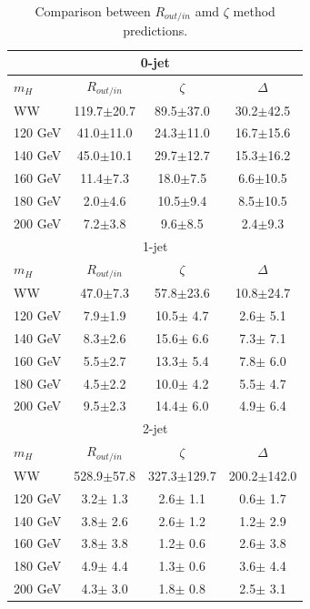 \begin{table}
{%
 \begin{center}
 \begin{tabular}{l | c c | c }
\hline
\multicolumn{4}{c}{0-jet} \\
 \hline
 $m_H$ & $R_{out/in}$ & $\zeta$ & $\Delta$ \\
 \hline
         WW & 119.7$\pm$20.7 & 89.5$\pm$37.0 & 30.2$\pm$42.5 \\
    120 GeV &  41.0$\pm$11.0 & 24.3$\pm$11.0 & 16.7$\pm$15.6 \\
    140 GeV &  45.0$\pm$10.1 & 29.7$\pm$12.7 & 15.3$\pm$16.2 \\
    160 GeV &  11.4$\pm$7.3  & 18.0$\pm$7.5  &  6.6$\pm$10.5 \\
    180 GeV &   2.0$\pm$4.6  & 10.5$\pm$9.4  &  8.5$\pm$10.5 \\
    200 GeV &   7.2$\pm$3.8  &  9.6$\pm$8.5  &  2.4$\pm$9.3  \\
 \hline
 \hline
\multicolumn{4}{c}{1-jet} \\
 \hline
 $m_H$ & $R_{out/in}$ & $\zeta$ & $\Delta$ \\
 \hline
         WW & 47.0$\pm$7.3 & 57.8$\pm$23.6 & 10.8$\pm$24.7 \\
    120 GeV &  7.9$\pm$1.9 & 10.5$\pm$ 4.7 &  2.6$\pm$ 5.1 \\
    140 GeV &  8.3$\pm$2.6 & 15.6$\pm$ 6.6 &  7.3$\pm$ 7.1 \\
    160 GeV &  5.5$\pm$2.7 & 13.3$\pm$ 5.4 &  7.8$\pm$ 6.0 \\
    180 GeV &  4.5$\pm$2.2 & 10.0$\pm$ 4.2 &  5.5$\pm$ 4.7 \\
    200 GeV &  9.5$\pm$2.3 & 14.4$\pm$ 6.0 &  4.9$\pm$ 6.4 \\
 \hline
 \hline
\multicolumn{4}{c}{2-jet} \\
 \hline
 $m_H$ & $R_{out/in}$ & $\zeta$ & $\Delta$ \\
 \hline
         WW & 528.9$\pm$57.8 & 327.3$\pm$129.7 & 200.2$\pm$142.0 \\
    120 GeV &   3.2$\pm$ 1.3 &   2.6$\pm$  1.1 &   0.6$\pm$  1.7 \\
    140 GeV &   3.8$\pm$ 2.6 &   2.6$\pm$  1.2 &   1.2$\pm$  2.9 \\
    160 GeV &   3.8$\pm$ 3.8 &   1.2$\pm$  0.6 &   2.6$\pm$  3.8 \\
    180 GeV &   4.9$\pm$ 4.4 &   1.3$\pm$  0.6 &   3.6$\pm$  4.4 \\
    200 GeV &   4.3$\pm$ 3.0 &   1.8$\pm$  0.8 &   2.5$\pm$  3.1 \\
 \hline
\end{tabular}
\end{center}
}
\caption{Comparison between $R_{out/in}$ amd $\zeta$ method predictions.}
\label{tab:dy_zeta}
\end{table}

